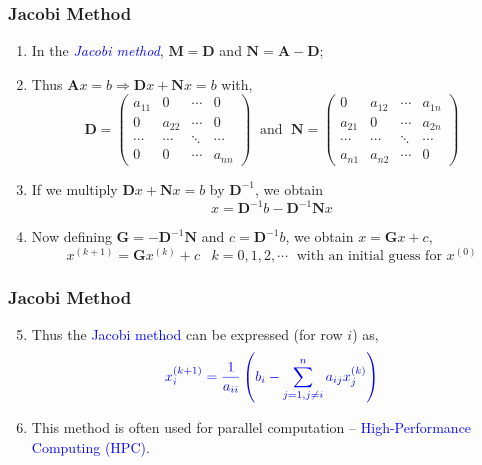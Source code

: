 \documentclass[10pt,compress,handout,ignorenonframetext]{beamer}
\begin{document}
\begin{frame}
  \frametitle{Jacobi Method} 
  \begin{enumerate}
     \item <1-> In the \textcolor{blue}{\it Jacobi method}, $\bm{M}=\bm{D}$ and $\bm{N}=\bm{A}-\bm{D}$;
     \item <2-> Thus $\bm{A}x=b \Longrightarrow \bm{D}x+\bm{N}x=b$ with,
       \begin{displaymath}
          \bm{D}=\begin{pmatrix}a_{11} & 0  & \cdots & 0 \\ 0 & a_{22} & \cdots & 0 \\ \cdots & \cdots & \ddots & \cdots \\ 0 & 0 & \cdots & a_{nn}\end{pmatrix}\;\text{ and }\; \bm{N} = \begin{pmatrix} 0 & a_{12} & \cdots & a_{1n} \\ a_{21} & 0 & \cdots & a_{2n} \\ \cdots & \cdots & \ddots & \cdots \\ a_{n1} & a_{n2} & \cdots & 0 \end{pmatrix}  
       \end{displaymath}
     \item <3-> If we multiply $\bm{D}x+\bm{N}x=b$ by $\bm{D}^{-1}$, we obtain 
        \begin{displaymath}
          x = \bm{D}^{-1}b-\bm{D}^{-1}\bm{N}x
        \end{displaymath}
     \item <4-> Now defining $\bm{G}=-\bm{D}^{-1}\bm{N}$ and $c=\bm{D}^{-1}b$, we obtain $x = \bm{G}x + c$,
        \begin{displaymath}
          x^{(k+1)} = \bm{G}x^{(k)} + c \;\;\; k = 0, 1, 2, \cdots \;\text { with an initial guess for } x^{(0)}  
        \end{displaymath}
  \end{enumerate}
\end{frame}


\begin{frame}
  \frametitle{Jacobi Method} 
  \begin{enumerate}
  \setcounter{enumi}{4}
     \item <1-> Thus the \textcolor{blue}{Jacobi method} can be expressed (for row $i$) as,
         \begin{equation} 
            \textcolor{blue}{x_{i}^{(k+1)} = \frac{1}{a_{ii}}\left(b_{i}-\sum\limits_{j=1,j\neq i}^{n}a_{ij}x_{j}^{(k)}\right)}
         \end{equation}
     \item <2-> This method is often used for parallel computation -- \textcolor{blue}{High-Performance Computing (HPC)}.
  \end{enumerate}
\end{frame}
\end{document}
